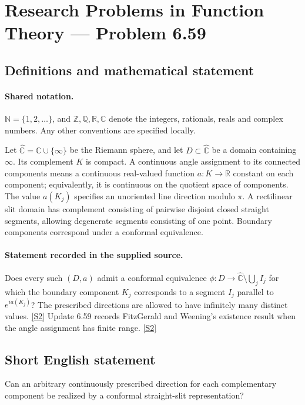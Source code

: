 \documentclass[11pt]{article}
\newcommand{\sref}[2]{\hyperlink{source:#1:#2}{[S#2]}}
\begin{document}
\section{Research Problems in Function Theory — Problem 6.59}\label{statement}

\subsection{Definitions and mathematical statement}

\paragraph{Shared notation.}$\mathbb N=\{1,2,\ldots\}$, and $\mathbb Z,\mathbb Q,\mathbb R,\mathbb C$ denote the integers, rationals, reals and complex numbers. Any other conventions are specified locally.


Let $\widehat{\mathbb C}=\mathbb C\cup\{\infty\}$ be the Riemann sphere, and let $D\subset\widehat{\mathbb C}$ be a domain containing $\infty$. Its complement $K$ is compact. A continuous angle assignment to its connected components means a continuous real-valued function $a:K\to\mathbb R$ constant on each component; equivalently, it is continuous on the quotient space of components. The value $a(K_j)$ specifies an unoriented line direction modulo $\pi$. A rectilinear slit domain has complement consisting of pairwise disjoint closed straight segments, allowing degenerate segments consisting of one point. Boundary components correspond under a conformal equivalence.
\paragraph{Statement recorded in the supplied source.}
Does every such $(D,a)$ admit a conformal equivalence $\phi:D\to\widehat{\mathbb C}\setminus\bigcup_j I_j$ for which the boundary component $K_j$ corresponds to a segment $I_j$ parallel to $e^{ia(K_j)}$? The prescribed directions are allowed to have infinitely many distinct values. \sref{statement}{2}
Update 6.59 records FitzGerald and Weening's existence result when the angle assignment has finite range. \sref{statement}{2}
\subsection{Short English statement}
Can an arbitrary continuously prescribed direction for each complementary component be realized by a conformal straight-slit representation?
\end{document}
